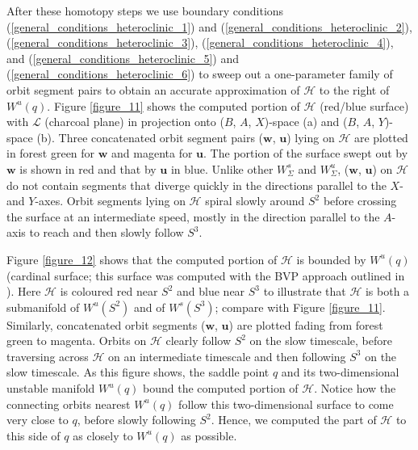 \documentclass{ws-ijbc}
\begin{document}
After these homotopy steps we use boundary conditions (\ref{general_conditions_heteroclinic_1}) and (\ref{general_conditions_heteroclinic_2}), (\ref{general_conditions_heteroclinic_3}), (\ref{general_conditions_heteroclinic_4}), and (\ref{general_conditions_heteroclinic_5}) and (\ref{general_conditions_heteroclinic_6}) to sweep out a one-parameter family of orbit segment pairs to obtain an accurate approximation of $\mathscr{H}$ to the right of $W^u(q)$.  Figure \ref{figure_11} shows the computed portion of $\mathscr{H}$ (red/blue surface) with $\mathscr{L}$ (charcoal plane) in projection onto ($B$, $A$, $X$)-space (a) and ($B$, $A$, $Y$)-space (b).  Three concatenated orbit segment pairs ($\mathbf{w}$, $\mathbf{u}$) lying on $\mathscr{H}$ are plotted in forest green for $\mathbf{w}$ and magenta for $\mathbf{u}$.  The portion of the surface swept out by $\mathbf{w}$ is shown in red and that by $\mathbf{u}$ in blue.  Unlike other $W^s_\Sigma$ and $W^u_\Sigma$, ($\mathbf{w}$, $\mathbf{u}$) on $\mathscr{H}$ do not contain segments that diverge quickly in the directions parallel to the $X$- and $Y$-axes.  Orbit segments lying on $\mathscr{H}$ spiral slowly around $S^2$ before crossing the surface at an intermediate speed, mostly in the direction parallel to the $A$-axis to reach and then slowly follow $S^3$.

Figure \ref{figure_12} shows that the computed portion of $\mathscr{H}$ is bounded by $W^u(q)$ (cardinal surface; this surface was computed with the BVP approach outlined in \cite{Red_book}).  Here $\mathscr{H}$ is coloured red near $S^2$ and blue near $S^3$ to illustrate that $\mathscr{H}$ is both a submanifold of $W^u(S^2)$ and of $W^s(S^3)$; compare with Figure \ref{figure_11}.  Similarly, concatenated orbit segments ($\mathbf{w}$, $\mathbf{u}$) are plotted fading from forest green to magenta.  Orbits on $\mathscr{H}$ clearly follow $S^2$ on the slow timescale, before traversing across $\mathscr{H}$ on an intermediate timescale and then following $S^3$ on the slow timescale.  As this figure shows, the saddle point $q$ and its two-dimensional unstable manifold $W^u(q)$ bound the computed portion of $\mathscr{H}$.  Notice how the connecting orbits nearest $W^u(q)$ follow this two-dimensional surface to come very close to $q$, before slowly following $S^2$. Hence, we computed the part of $\mathscr{H}$ to this side of $q$ as closely to $W^u(q)$ as possible.
\end{document}
